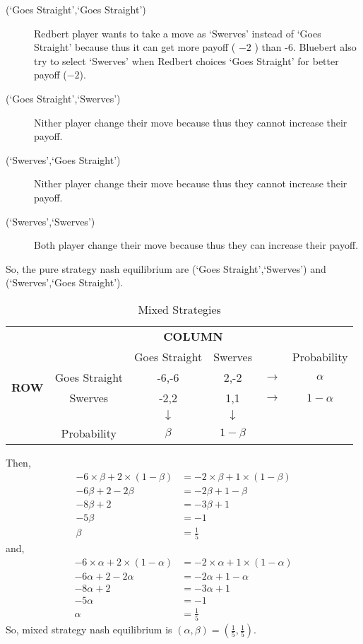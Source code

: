 \documentclass[a4paper,12pt]{article}
\begin{document}
\begin{enumerate}
\begin{enumerate}
\begin{description}
 \item [(`Goes Straight',`Goes Straight')] Redbert player wants to take a move as `Swerves' instead of `Goes Straight' because thus it can get more payoff ( $-2$ ) than -6. Bluebert also try to select `Swerves' when Redbert choices `Goes Straight' for better payoff ($-2$).
 
 \item [(`Goes Straight',`Swerves')] Nither player change their move because thus they cannot increase their payoff.

 \item [(`Swerves',`Goes Straight')] Nither player change their move because thus they cannot increase their payoff.
 \item [(`Swerves',`Swerves')] Both player change their move because thus they can increase their payoff.
 \end{description}
 So, the pure strategy nash equilibrium are (`Goes Straight',`Swerves') and (`Swerves',`Goes Straight').

 \begin{table}[H]
 \centering
\begin{tabular}{@{}cccccc@{}}
\toprule
\multicolumn{2}{c}{} & \multicolumn{2}{c}{\bfseries COLUMN}\\
\multicolumn{2}{c}{} & Goes Straight & Swerves & & Probability\\
\multirow{2}{*}{\bfseries ROW} & Goes Straight & -6,-6 & 2,-2 & $\rightarrow$ & $\alpha$\\
 & Swerves & -2,2 & 1,1 & $\rightarrow$ & $1-\alpha$\\
 & & $\downarrow$ & $\downarrow$ & \\
 & Probability & $\beta$ & $1-\beta$ &\\
 \bottomrule
\end{tabular}
\caption{Mixed Strategies}
\end{table}

Then,
\begin{align*}
-6\times\beta + 2\times(1-\beta)  & = -2\times \beta + 1\times(1-\beta)\\
-6\beta +2-2\beta &=-2\beta +1-\beta\\
-8\beta+2 &=-3\beta+1\\
-5\beta &=-1\\
\beta &=\frac{1}{5}
\end{align*}
and,
\begin{align*}
-6\times\alpha+2\times(1-\alpha) &=-2\times \alpha+1\times(1-\alpha)\\
-6\alpha+2-2\alpha &=-2\alpha+1-\alpha\\
-8\alpha+2 &=-3\alpha+1\\
-5\alpha &=-1\\
\alpha&=\frac{1}{5}
\end{align*}
So, mixed strategy nash equilibrium is $(\alpha,\beta)=(\frac{1}{5},\frac{1}{5})$.
\end{enumerate}


\end{enumerate}
\end{document}
